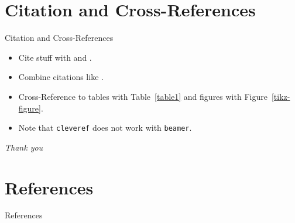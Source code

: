 \documentclass[hyperref={pdfpagemode=UseOutlines},xcolor=dvipsnames]{beamer}
\begin{document}
\section{Citation and Cross-References}
\begin{frame}{Citation and Cross-References}
	\begin{itemize}
		\item Cite stuff with \cite{article} and \cite{misc}.
		\item Combine citations like \cite{book,incollection}.
		\item Cross-Reference to tables with Table~\ref{table1} and figures with Figure~\ref{tikz-figure}.
		\item Note that \texttt{cleveref} does not work with \texttt{beamer}.
	\end{itemize}
\end{frame}

\begin{frame}
	\centering \Large
	\emph{Thank you}
\end{frame}

\section{References}
\begin{frame}[allowframebreaks]{References}
	\nocite{*}
	\printbibliography
\end{frame}
\end{document}
